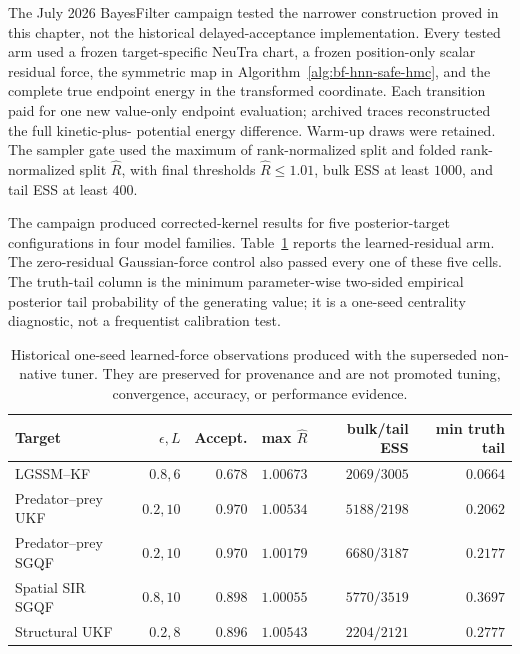 The July 2026 BayesFilter campaign tested the narrower construction proved in
this chapter, not the historical delayed-acceptance implementation.  Every
tested arm used a frozen target-specific NeuTra chart, a frozen position-only
scalar residual force, the symmetric map in
Algorithm~\ref{alg:bf-hnn-safe-hmc}, and the complete true endpoint energy in
the transformed coordinate.  Each transition paid for one new value-only
endpoint evaluation; archived traces reconstructed the full kinetic-plus-
potential energy difference.  Warm-up draws were retained.  The sampler gate
used the maximum of rank-normalized split and folded rank-normalized split
$\widehat R$, with final thresholds $\widehat R\leq1.01$, bulk ESS at least
$1000$, and tail ESS at least $400$.

The campaign produced corrected-kernel results for five posterior-target
configurations in four model families.  Table~\ref{tab:bf-hnn-corrected-results}
reports the learned-residual arm.  The zero-residual Gaussian-force control also
passed every one of these five cells.  The truth-tail column is the minimum
parameter-wise two-sided empirical posterior tail probability of the generating
value; it is a one-seed centrality diagnostic, not a frequentist calibration
test.

\begin{table}[htbp]
\centering
\small
\begin{tabular}{lrrrrr}
\toprule
Target & $\epsilon,L$ & Accept. & max $\widehat R$ & bulk/tail ESS & min truth tail \\
\midrule
LGSSM--KF & $0.8,6$ & $0.678$ & $1.00673$ & $2069/3005$ & $0.0664$ \\
Predator--prey UKF & $0.2,10$ & $0.970$ & $1.00534$ & $5188/2198$ & $0.2062$ \\
Predator--prey SGQF & $0.2,10$ & $0.970$ & $1.00179$ & $6680/3187$ & $0.2177$ \\
Spatial SIR SGQF & $0.8,10$ & $0.898$ & $1.00055$ & $5770/3519$ & $0.3697$ \\
Structural UKF & $0.2,8$ & $0.896$ & $1.00543$ & $2204/2121$ & $0.2777$ \\
\bottomrule
\end{tabular}
\caption{Historical one-seed learned-force observations produced with the
superseded non-native tuner.  They are preserved for provenance and are not
promoted tuning, convergence, accuracy, or performance evidence.}
\label{tab:bf-hnn-corrected-results}
\end{table}

